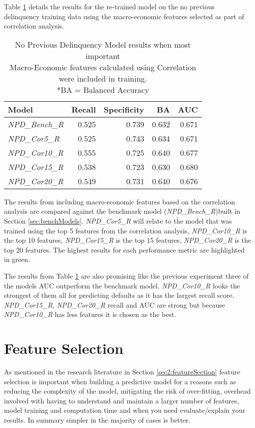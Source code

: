 Table \ref{table:NPDCorrModelResults} details the results for the
re-trained model on the no previous delinquency training data using the macro-economic features selected as part of correlation analysis.
\begin{table}[H]
	\centering
	\small
	\begin{tabular}{l r r r r}
		\hline
		\textbf{Model} & \textbf{Recall} & \textbf{Specificity} & \textbf{BA} & \textbf{AUC}  \\ \hline
		\textit{NPD\_Bench\_R} & 0.525 & 0.739 & 0.632 & 0.671   \\ \hline
		\textit{NPD\_Cor5\_R}  & 0.525 & \cellcolor{green!25}0.743 & 0.634 & 0.671   \\ 
		\textit{NPD\_Cor10\_R} & \cellcolor{green!25}0.555 & 0.725 & \cellcolor{green!25}0.640 & 0.677  \\ 
		\textit{NPD\_Cor15\_R} & 0.538 & 0.723 & 0.630 & \cellcolor{green!25}0.680  \\
		\textit{NPD\_Cor20\_R} & 0.549 & 0.731 & \cellcolor{green!25}0.640 & 0.676  \\\hline 
	\end{tabular}
	\caption{No Previous Delinquency Model results when most important \\Macro-Economic features calculated using Correlation were included in training.\\
		*BA = Balanced Accuracy}
	\label{table:NPDCorrModelResults}
\end{table}

The results from including macro-economic features based on the correlation analysis are compared against the benchmark model (\textit{NPD\_Bench\_R})built in Section \ref{sec:benchModels}. \textit{NPD\_Cor5\_R} will relate to the model that was trained using the top 5 features from the correlation analysis, \textit{NPD\_Cor10\_R} is the top 10 features, \textit{NPD\_Cor15\_R} is the top 15 features, \textit{NPD\_Cor20\_R} is the top 20 features. The highest results for each performance metric are highlighted in green.

The results from Table \ref{table:NPDCorrModelResults} are also
promising like the previous experiment three of the models AUC outperform the benchmark model. \textit{NPD\_Cor10\_R} looks the strongest of them all for predicting defaults as it has the largest recall score.  \textit{NPD\_Cor15\_R},  \textit{NPD\_Cor20\_R} recall and AUC are strong but because  \textit{NPD\_Cor10\_R} has less features it is chosen as the best.

\section{Feature Selection}
As mentioned in the research literature in Section \ref{sec2:featureSection} feature selection is important when building a predictive model for a reasons such as reducing the complexity of the model, mitigating the risk of over-fitting, overhead involved with having to understand and maintain a larger number of features, model training and computation time and when you need evaluate/explain your results. In summary simpler in the majority of cases is better.

